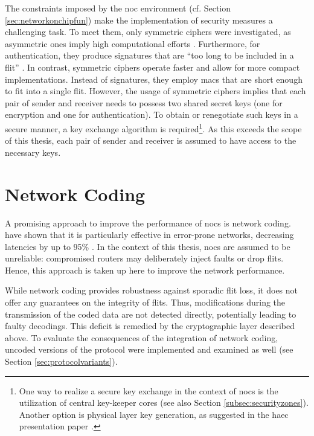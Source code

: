 The constraints imposed by the \gls{noc} environment (cf. Section \ref{sec:networkonchipfun}) make the implementation of security measures a
challenging task. To meet them, only symmetric ciphers were investigated, as asymmetric ones imply high computational efforts
\cite[3]{moriam18activeattackers}. Furthermore, for authentication, they produce signatures that are \enquote{too long to be included in a flit}
\cite[3]{moriam18activeattackers}. In contrast, symmetric ciphers operate faster and allow for more compact implementations. Instead of
signatures, they employ \glspl{mac} that are short enough to fit into a single flit. However, the usage of symmetric ciphers implies that each pair of
sender and receiver needs to possess two shared secret keys (one for encryption and one for authentication). To obtain or renegotiate
such keys in a secure manner, a key exchange algorithm is required\footnote{One way to realize a secure key exchange in the context of \glspl{noc} is
the utilization of central key-keeper cores \cite{gebotys03securityframework} (see also Section \ref{subsec:securityzones}). Another option is
physical layer key generation, as suggested in the \gls{haec} presentation paper \cite[4]{matthiesen17haec}.}. As this exceeds the scope of this
thesis, each pair of sender and receiver is assumed to have access to the necessary keys.

\section{Network Coding}\label{sec:networkcodingover}
A promising approach to improve the performance of \glspl{noc} is network coding. \citeauthor{moriam15manycorenc} have shown that it is particularly
effective in error-prone networks, decreasing latencies by up to 95\% \cite[7]{moriam15manycorenc}. In the context of this thesis, \glspl{noc} are assumed
to be unreliable: compromised routers may deliberately inject faults or drop flits. Hence, this approach is taken up here to improve the network
performance.

While network coding provides robustness against sporadic flit loss, it does not offer any guarantees on the integrity of flits. Thus, modifications
during the transmission of the coded data are not detected directly, potentially leading to faulty decodings. This deficit is remedied by the cryptographic
layer described above. To evaluate the consequences of the integration of network coding, uncoded versions of the protocol were implemented and
examined as well (see Section \ref{sec:protocolvariants}).


